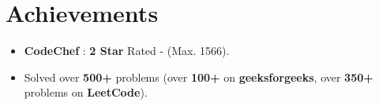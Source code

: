 \documentclass[letterpaper,11pt]{article}
\newcommand{\resumeItem}[1]{
  \item\small{
    {#1 \vspace{-2pt}}
  }
}
\newcommand{\resumeSubHeadingListStart}{\begin{itemize}[leftmargin=0.0in, label={}]}
\newcommand{\resumeSubHeadingListEnd}{\end{itemize}}
\newcommand{\resumeItemListStart}{\begin{itemize}}
\newcommand{\resumeItemListEnd}{\end{itemize}\vspace{-5pt}}
\begin{document}
\section{Achievements}
    \resumeSubHeadingListStart
            \resumeItemListStart
                \resumeItem{\textbf{CodeChef} : \textbf{2 Star} Rated - (Max. 1566).}
                \resumeItem{Solved over \textbf{500+} problems (over \textbf{100+} on \textbf{geeksforgeeks}, over \textbf{350+} problems on \textbf{LeetCode}).}
            \resumeItemListEnd
        
    \resumeSubHeadingListEnd
\end{document}
